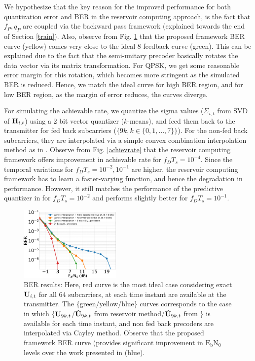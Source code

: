 \documentclass[conference]{IEEEtran}
\begin{document}
We hypothesize that the key reason for the improved performance for both quantization error and BER in the reservoir computing approach, is the fact that $f_P,q_P$ are coupled via the backward pass framework (explained towards the end of Section \ref{train}). Also, observe from Fig. \ref{BER} that the proposed framework BER curve (yellow) comes very close to the ideal $8$ feedback curve (green). This can be explained due to the fact that the semi-unitary precoder basically rotates the data vector via its matrix transformation. For QPSK, we get some reasonable error margin for this rotation, which becomes more stringent as the simulated BER is reduced. Hence, we match the ideal curve for high BER region, and for low BER region, as the margin of error reduces, the curves diverge.

\noindent For simulating the achievable rate, we quantize the sigma values ($\Sigma_{i,t}$ from SVD of ${\bf H}_{i,t}$) using a 2 bit vector quantizer ($k$-means), and feed them back to the transmitter for fed back subcarriers ($\{9k, k \in \{0,1,\ldots,7\}\}$). For the non-fed back subcarriers, they are interpolated via a simple convex combination interpolation method as in \cite{Gupt1905:Predictive}. Observe from Fig. \ref{achievrate} that the reservoir computing framework offers improvement in achievable rate for $f_DT_s=10^{-4}$. Since the temporal variations for $f_DT_s=10^{-2}, 10^{-1}$ are higher, the reservoir computing framework has to learn a faster-varying function, and hence the degradation in performance. However, it still matches the performance of the predictive quantizer in \cite{6891198} for $f_DT_s=10^{-2}$ and performs slightly better for $f_DT_s=10^{-1}$.
\vspace{-3pt}

\begin{figure}
\centering
\includegraphics[width=0.44\textwidth]{images/BER_res.pdf}
\caption{BER results: Here, red curve is the most ideal case considering exact ${\bf U}_{i,t}$ for all 64 subcarriers, at each time instant are available at the transmitter. The \{green/yellow/blue\} curves corresponds to the case in which \{${\bf U}_{9k,t}$/$\tilde{{\bf U}}_{9k,t}$ from reservoir method/$\tilde{{\bf U}}_{9k,t}$ from \cite{6891198}\} is available for each time instant, and non fed back precoders are interpolated via Cayley method. Observe that the proposed framework BER curve (provides significant improvement in $\text{E}_\text{b}\text{N}_0$ levels over the work presented in \cite{6891198} (blue).}
\label{BER}
\end{figure}
\end{document}

